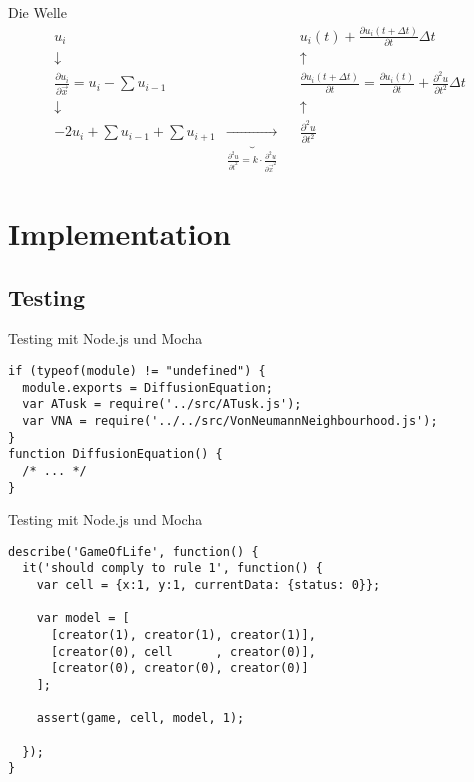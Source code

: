 \documentclass{beamer}
\begin{document}
\begin{frame}{Die Welle}
\begin{align*}
u_i &&&  u_i(t) +  \frac{\partial u_i(t+\Delta t)}{\partial t}\Delta t \\
\downarrow &&& \uparrow \\
\frac{\partial u_i}{\partial \vec x} = u_i - \sum u_{i-1} &&& \frac{\partial u_i(t+\Delta t)}{\partial t} = \frac{\partial u_i(t)}{\partial t} + \frac{\partial^2 u}{\partial t^2}\Delta t \\
\downarrow &&& \uparrow \\
  -2u_i + \sum u_{i-1} + \sum u_{i+1} & \underbrace{\longrightarrow}_{\frac{\partial^2 u}{\partial t^2} = k\cdot \frac{\partial^2 u}{\partial \vec{x}^2}} && \frac{\partial^2 u}{\partial t^2}
\end{align*}
\end{frame}

\section{Implementation}

\subsection{Testing}

\begin{frame}[fragile]{Testing mit Node.js und Mocha}
\begin{lstlisting}
if (typeof(module) != "undefined") {
  module.exports = DiffusionEquation;
  var ATusk = require('../src/ATusk.js');
  var VNA = require('../../src/VonNeumannNeighbourhood.js');
}
function DiffusionEquation() {
  /* ... */
}

\end{lstlisting}
\end{frame}

\begin{frame}[fragile]{Testing mit Node.js und Mocha}
\begin{lstlisting}
describe('GameOfLife', function() {
  it('should comply to rule 1', function() {
    var cell = {x:1, y:1, currentData: {status: 0}};
			
    var model = [
      [creator(1), creator(1), creator(1)],
      [creator(0), cell      , creator(0)],
      [creator(0), creator(0), creator(0)]
    ];
		
    assert(game, cell, model, 1);
				
  });
}
\end{lstlisting}
\end{frame}
\end{document}
